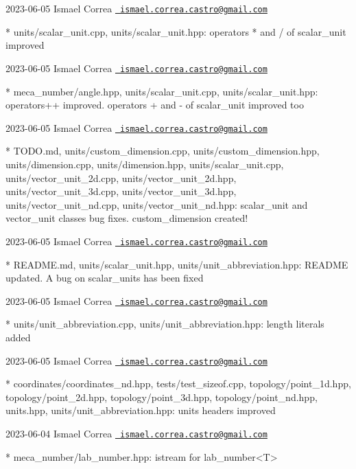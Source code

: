  2023-\/06-\/05 Ismael Correa \href{mailto:ismael.correa.castro@gmail.com}{\texttt{ ismael.\+correa.\+castro@gmail.\+com}} \begin{DoxyVerb}* units/scalar_unit.cpp, units/scalar_unit.hpp: operators * and / of
scalar_unit improved
\end{DoxyVerb}
 2023-\/06-\/05 Ismael Correa \href{mailto:ismael.correa.castro@gmail.com}{\texttt{ ismael.\+correa.\+castro@gmail.\+com}} \begin{DoxyVerb}* meca_number/angle.hpp, units/scalar_unit.cpp,
units/scalar_unit.hpp: operators++ improved. operators + and - of
scalar_unit improved too
\end{DoxyVerb}
 2023-\/06-\/05 Ismael Correa \href{mailto:ismael.correa.castro@gmail.com}{\texttt{ ismael.\+correa.\+castro@gmail.\+com}} \begin{DoxyVerb}* TODO.md, units/custom_dimension.cpp, units/custom_dimension.hpp,
units/dimension.cpp, units/dimension.hpp, units/scalar_unit.cpp,
units/vector_unit_2d.cpp, units/vector_unit_2d.hpp,
units/vector_unit_3d.cpp, units/vector_unit_3d.hpp,
units/vector_unit_nd.cpp, units/vector_unit_nd.hpp: scalar_unit and
vector_unit classes bug fixes. custom_dimension created!
\end{DoxyVerb}
 2023-\/06-\/05 Ismael Correa \href{mailto:ismael.correa.castro@gmail.com}{\texttt{ ismael.\+correa.\+castro@gmail.\+com}} \begin{DoxyVerb}* README.md, units/scalar_unit.hpp, units/unit_abbreviation.hpp: 
README updated. A bug on scalar_units has been fixed
\end{DoxyVerb}
 2023-\/06-\/05 Ismael Correa \href{mailto:ismael.correa.castro@gmail.com}{\texttt{ ismael.\+correa.\+castro@gmail.\+com}} \begin{DoxyVerb}* units/unit_abbreviation.cpp, units/unit_abbreviation.hpp: length
literals added
\end{DoxyVerb}
 2023-\/06-\/05 Ismael Correa \href{mailto:ismael.correa.castro@gmail.com}{\texttt{ ismael.\+correa.\+castro@gmail.\+com}} \begin{DoxyVerb}* coordinates/coordinates_nd.hpp, tests/test_sizeof.cpp,
topology/point_1d.hpp, topology/point_2d.hpp,
topology/point_3d.hpp, topology/point_nd.hpp, units.hpp,
units/unit_abbreviation.hpp: units headers improved
\end{DoxyVerb}
 2023-\/06-\/04 Ismael Correa \href{mailto:ismael.correa.castro@gmail.com}{\texttt{ ismael.\+correa.\+castro@gmail.\+com}} \begin{DoxyVerb}* meca_number/lab_number.hpp: istream for lab_number<T>
\end{DoxyVerb}
